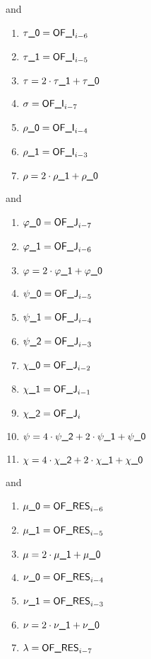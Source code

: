 \noindent and
\begin{multicols}{4}
\begin{enumerate}
	\item $\tau\textsf{\_0} = \textsf{OF\_I}_{i - 6}$
	\item $\tau\textsf{\_1} = \textsf{OF\_I}_{i - 5}$
	\item $\tau          = 2 \cdot \tau\textsf{\_1} + \tau\textsf{\_0}$
	\item $\sigma        = \textsf{OF\_I}_{i - 7}$
	\item $\rho\textsf{\_0} = \textsf{OF\_I}_{i - 4}$
	\item $\rho\textsf{\_1} = \textsf{OF\_I}_{i - 3}$
	\item $\rho          = 2 \cdot \rho\textsf{\_1} + \rho\textsf{\_0}$
\end{enumerate}
\end{multicols}
\noindent and
\begin{multicols}{4}
\begin{enumerate}
	\item $\varphi\textsf{\_0} = \textsf{OF\_J}_{i - 7}$
	\item $\varphi\textsf{\_1} = \textsf{OF\_J}_{i - 6}$
	\item $\varphi          = 2 \cdot \varphi\textsf{\_1} + \varphi\textsf{\_0}$
	\item $\psi\textsf{\_0}    = \textsf{OF\_J}_{i - 5}$
	\item $\psi\textsf{\_1}    = \textsf{OF\_J}_{i - 4}$
	\item $\psi\textsf{\_2}    = \textsf{OF\_J}_{i - 3}$
	\item $\chi\textsf{\_0}    = \textsf{OF\_J}_{i - 2}$
	\item $\chi\textsf{\_1}    = \textsf{OF\_J}_{i - 1}$
	\item $\chi\textsf{\_2}    = \textsf{OF\_J}_{i}$
	\item $\psi             = 4 \cdot \psi\textsf{\_2} + 2 \cdot \psi\textsf{\_1} + \psi\textsf{\_0}$
	\item $\chi             = 4 \cdot \chi\textsf{\_2} + 2 \cdot \chi\textsf{\_1} + \chi\textsf{\_0}$
\end{enumerate}
\end{multicols}
\noindent and
\begin{multicols}{3}
\begin{enumerate}
	\item $\mu\textsf{\_0} = \textsf{OF\_RES}_{i - 6}$
	\item $\mu\textsf{\_1} = \textsf{OF\_RES}_{i - 5}$
	\item $\mu          = 2 \cdot \mu\textsf{\_1} + \mu\textsf{\_0}$
	\item $\nu\textsf{\_0} = \textsf{OF\_RES}_{i - 4}$
	\item $\nu\textsf{\_1} = \textsf{OF\_RES}_{i - 3}$
	\item $\nu          = 2 \cdot \nu\textsf{\_1} + \nu\textsf{\_0}$
	\item $\lambda      = \textsf{OF\_RES}_{i - 7}$
\end{enumerate}
\end{multicols}

